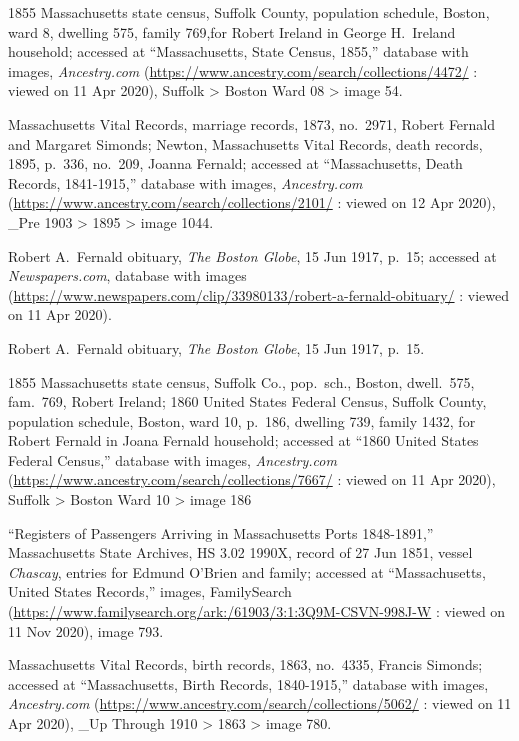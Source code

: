 \begin{thebibliography}{999}
1855 Massachusetts state census, Suffolk County, population schedule, Boston, ward 8, dwelling 575, family 769,for Robert Ireland in George H.\ Ireland household; accessed at ``Massachusetts, State Census, 1855,'' database with images, \textit{Ancestry.com} (\url{https://www.ancestry.com/search/collections/4472/} : viewed on 11 Apr 2020), Suffolk > Boston Ward 08 > image 54.

Massachusetts Vital Records, marriage records, 1873, no.\ 2971, Robert Fernald and Margaret Simonds; Newton, Massachusetts Vital Records, death records, 1895, p.\ 336, no.\ 209, Joanna Fernald; accessed at ``Massachusetts, Death Records, 1841-1915,'' database with images, \textit{Ancestry.com} (\url{https://www.ancestry.com/search/collections/2101/} : viewed on 12 Apr 2020), \_Pre 1903 > 1895 > image 1044.

Robert A.\ Fernald obituary, \textit{The Boston Globe}, 15 Jun 1917, p.\ 15; accessed at \textit{Newspapers.com}, database with images (\url{https://www.newspapers.com/clip/33980133/robert-a-fernald-obituary/} : viewed on 11 Apr 2020).

Robert A.\ Fernald obituary, \textit{The Boston Globe}, 15 Jun 1917, p.\ 15.

1855 Massachusetts state census, Suffolk Co., pop.\ sch., Boston, dwell.\ 575, fam.\ 769, Robert Ireland; 1860 United States Federal Census, Suffolk County, population schedule, Boston, ward 10, p.\ 186, dwelling 739, family 1432, for Robert Fernald in Joana Fernald household; accessed at ``1860 United States Federal Census,'' database with images, \textit{Ancestry.com} (\url{https://www.ancestry.com/search/collections/7667/} : viewed on 11 Apr 2020), Suffolk > Boston Ward 10 > image 186

``Registers of Passengers Arriving in Massachusetts Ports 1848-1891,'' Massachusetts State Archives, HS 3.02 1990X, record of 27 Jun 1851, vessel \textit{Chascay}, entries for Edmund O'Brien and family; accessed at ``Massachusetts, United States Records,'' images, FamilySearch (\url{https://www.familysearch.org/ark:/61903/3:1:3Q9M-CSVN-998J-W} : viewed on 11 Nov 2020), image 793.

Massachusetts Vital Records, birth records, 1863, no.\ 4335, Francis Simonds; accessed at ``Massachusetts, Birth Records, 1840-1915,'' database with images, \textit{Ancestry.com} (\url{https://www.ancestry.com/search/collections/5062/} : viewed on 11 Apr 2020), \_Up Through 1910 > 1863 > image 780.


\end{thebibliography}
